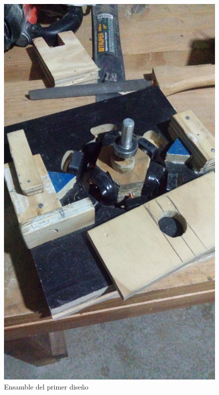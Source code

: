 \begin{figure}[!htbp]
\caption{Ensamble del primer dise\~no}
\centering
\includegraphics [scale=0.10]
{./img/20160228_204710.jpg}
\end{figure}

